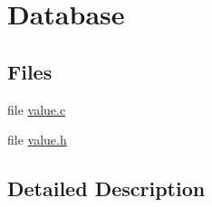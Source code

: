\hypertarget{group__database}{\section{Database}
\label{group__database}
}
\subsection*{Files}
\begin{DoxyCompactItemize}
\item 
file \hyperlink{value_8c}{value.\-c}
\item 
file \hyperlink{value_8h}{value.\-h}
\end{DoxyCompactItemize}


\subsection{Detailed Description}

